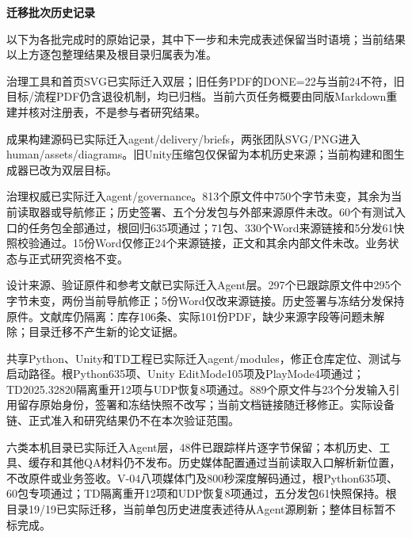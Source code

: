 \documentclass[11pt,a4paper]{article}
\newcommand{\reviewsubsection}[1]{\par\Needspace{4\baselineskip}\vspace{4pt}\begin{center}{\titlelatin\titlecjk\bfseries\fontsize{12}{18}\selectfont #1}\end{center}}
\begin{document}
\reviewsubsection{迁移批次历史记录}
以下为各批完成时的原始记录，其中下一步和未完成表述保留当时语境；当前结果以上方逐包整理结果及根目录归属表为准。


治理工具和首页SVG已实际迁入双层；旧任务PDF的DONE=22与当前24不符，旧目标/\allowbreak{}流程PDF仍含退役机制，均已归档。当前六页任务概要由同版Markdown重建并核对注册表，不是参与者研究结果。


成果构建源码已实际迁入agent/\allowbreak{}delivery/\allowbreak{}briefs，两张团队SVG/\allowbreak{}PNG进入human/\allowbreak{}assets/\allowbreak{}diagrams。旧Unity压缩包仅保留为本机历史来源；当前构建和图生成器已改为双层目标。


治理权威已实际迁入agent/\allowbreak{}governance。813个原文件中750个字节未变，其余为当前读取器或导航修正；历史签署、五个分发包与外部来源原件未改。60个有测试入口的任务包全部通过，根回归635项通过；71包、330个Word来源链接和5分发61快照校验通过。15份Word仅修正24个来源链接，正文和其余内部文件未改。业务状态与正式研究资格不变。


设计来源、验证原件和参考文献已实际迁入Agent层。297个已跟踪原文件中295个字节未变，两份当前导航修正；5份Word仅改来源链接。历史签署与冻结分发保持原件。文献库仍隔离：库存106条、实际101份PDF，缺少来源字段等问题未解除；目录迁移不产生新的论文证据。


共享Python、Unity和TD工程已实际迁入agent/\allowbreak{}modules，修正仓库定位、测试与启动路径。根Python635项、Unity EditMode105项及PlayMode4项通过；TD2025.32820隔离重开12项与UDP恢复8项通过。889个原文件与23个分发输入引用留存原始身份，签署和冻结快照不改写；当前文档链接随迁移修正。实际设备链、正式准入和研究结果仍不在本次验证范围。


六类本机目录已实际迁入Agent层，48件已跟踪样片逐字节保留；本机历史、工具、缓存和其他QA材料仍不发布。历史媒体配置通过当前读取入口解析新位置，不改原件或业务签收。V-\allowbreak{}04八项媒体门及800秒深度解码通过，根Python635项、60包专项通过；TD隔离重开12项和UDP恢复8项通过，五分发包61快照保持。根目录19/\allowbreak{}19已实际迁移，当前单包历史进度表述待从Agent源刷新；整体目标暂不标完成。
\end{document}
